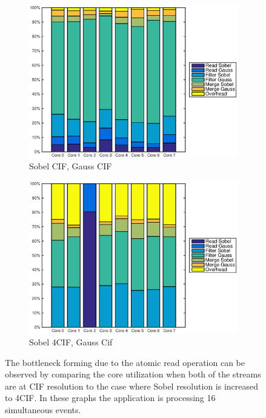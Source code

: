 \begin{figure}
    \centering
    \begin{subfigure}[t]{0.49\textwidth}
        \centering
        \includegraphics[width=0.99\linewidth]{images/openem_cifcif_8cores_eo.eps}
        \caption{Sobel CIF, Gauss CIF}
        \label{fig:oem8coreeo}
    \end{subfigure}
    \begin{subfigure}[t]{0.49\textwidth}
        \centering
        \includegraphics[width=0.99\linewidth]{images/openem_sobel4cif_gausscif_eo.eps}
        \caption{Sobel 4CIF, Gauss Cif}
        \label{fig:oem8coreeosobel4cif}
    \end{subfigure}
    \caption{The bottleneck forming due to the atomic read operation can be observed by comparing the core utilization when both of the streams are at CIF resolution to the case where Sobel resolution is increased to 4CIF. In these graphs the application is processing 16 simultaneous events.}
\end{figure}

